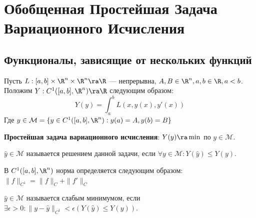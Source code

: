 
\section{Обобщенная Простейшая Задача Вариационного Исчисления}

\subsection{Функционалы, зависящие от нескольких функций}

Пусть \(L: [a, b] \times \R^n \times \R^n \ra \R\) --- непрерывна, \(A, B \in \R^n, a, b \in \R, a < b\). Положим \(Y: C^1([a, b], \R^n) \ra \R\) следующим образом:
\[Y(y) = \int_a^b L(x, y(x), y'(x))\]
Где \(y \in \mathcal{M} = \{y \in C^1([a, b], \R^n): y(a) = A, y(b) = B\}\)

\noindent\textbf{Простейшая задача вариационного исчисления}: \(Y(y) \ra \min\) по \(y \in \mathcal{M}\).

\begin{definition}
    \(\hat{y} \in \mathcal{M}\) называется решением данной задачи, если \(\forall y \in \mathcal{M}: Y(\hat{y}) \le Y(y)\).
\end{definition}

\begin{reminder}
    В \(C^1([a, b], \R^n)\) норма определяется следующим образом: \(\|f\|_{C^1} = \|f\|_C + \|f'\|_C\)
\end{reminder}

\begin{definition}
    \(\hat{y} \in \mathcal{M}\) называется слабым минимумом, если \(\exists \epsilon > 0: \|y - \hat{y}\|_{C^1} < \epsilon (Y(\hat{y}) \le Y(y))\).
\end{definition}

